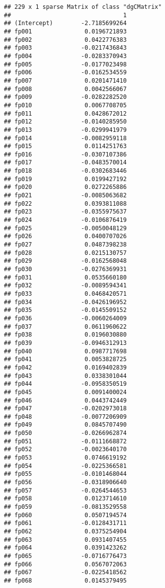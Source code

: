 \documentclass[]{article}
\begin{document}
\begin{verbatim}
## 229 x 1 sparse Matrix of class "dgCMatrix"
##                                1
## (Intercept)        -2.7185699264
## fp001               0.0196721893
## fp002               0.0422776383
## fp003              -0.0217436843
## fp004              -0.0283370943
## fp005              -0.0177023498
## fp006              -0.0162534559
## fp007               0.0201471410
## fp008               0.0042566067
## fp009              -0.0282282520
## fp010               0.0067708705
## fp011               0.0428672012
## fp012              -0.0140285950
## fp013              -0.0299941979
## fp014              -0.0082959118
## fp015               0.0114251763
## fp016              -0.0307107386
## fp017              -0.0483570014
## fp018              -0.0302683446
## fp019               0.0199427192
## fp020               0.0272265886
## fp021              -0.0085063682
## fp022               0.0393811088
## fp023              -0.0355975637
## fp024              -0.0106876419
## fp025              -0.0050048129
## fp026               0.0400707026
## fp027               0.0487398238
## fp028               0.0215130757
## fp029              -0.0162568048
## fp030              -0.0276369931
## fp031               0.0535660180
## fp032              -0.0089594341
## fp033               0.0468420571
## fp034              -0.0426196952
## fp035              -0.0145509152
## fp036              -0.0060264009
## fp037               0.0611960622
## fp038               0.0196030880
## fp039              -0.0946312913
## fp040               0.0987717698
## fp041               0.0053828725
## fp042               0.0169402839
## fp043               0.0338301044
## fp044              -0.0958350519
## fp045               0.0091400024
## fp046               0.0443742449
## fp047              -0.0202973018
## fp048              -0.0077206909
## fp049               0.0845707490
## fp050              -0.0266962874
## fp051              -0.0111668872
## fp052              -0.0023640170
## fp053               0.0746619192
## fp054              -0.0225366581
## fp055              -0.0101468044
## fp056              -0.0318906640
## fp057              -0.0264544653
## fp058               0.0123714610
## fp059              -0.0813529558
## fp060               0.0507194574
## fp061              -0.0128431711
## fp062               0.0375254904
## fp063               0.0931407455
## fp064               0.0391423262
## fp065              -0.0716776473
## fp066               0.0567072063
## fp067              -0.0225418562
## fp068               0.0145379495

\end{verbatim}
\end{document}
